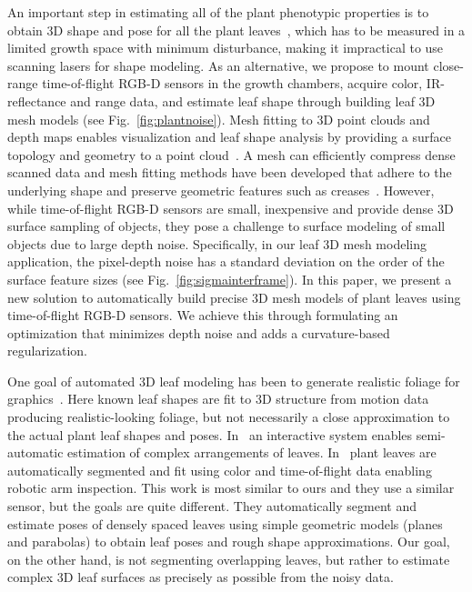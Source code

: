 An important step in estimating all of the plant phenotypic properties is to obtain $3$D shape and pose for all the plant leaves~\cite{muller2015leaf}, which has to be measured in a limited growth space with minimum disturbance, making it impractical to use scanning lasers for shape modeling. As an alternative, we propose to mount close-range time-of-flight RGB-D sensors in the growth chambers, acquire color, IR-reflectance and range data, and estimate leaf shape through building leaf $3$D mesh models (see Fig.~\ref{fig:plantnoise}). Mesh fitting to $3$D point clouds and depth maps enables visualization and leaf shape analysis by providing a surface topology and geometry to a point cloud~\cite{Sienz2000,Yeh2011}.  A mesh can efficiently compress dense scanned data and mesh fitting methods have been developed that adhere to the underlying shape and preserve geometric features such as creases~\cite{Hoppe1994,Kobbelt:1998}. 
%
However, while time-of-flight RGB-D sensors are small, inexpensive and provide dense $3$D surface sampling of objects, they pose a challenge to surface modeling of small objects due to large depth noise. Specifically, in our leaf $3$D mesh modeling application, the pixel-depth noise has a standard deviation on the order of the surface feature sizes (see Fig.~\ref{fig:sigmainterframe}). In this paper, we present a new solution to automatically build precise $3$D mesh models of plant leaves using time-of-flight RGB-D sensors. We achieve this through formulating an optimization that minimizes depth noise and adds a curvature-based regularization.  

One goal of automated $3$D leaf modeling has been to generate realistic foliage for graphics~\cite{Bradley:2013}.  Here known leaf shapes are fit to $3$D structure from motion data producing realistic-looking foliage, but not necessarily a close approximation to the actual plant leaf shapes and poses.  In~\cite{Quan:2006} an interactive system enables semi-automatic estimation of complex arrangements of leaves.   In~\cite{Alenya2011,Alenya2013} plant leaves are automatically segmented and fit using color and time-of-flight data enabling robotic arm inspection.  This work is most similar to ours and they use a similar sensor, but the goals are quite different.  They automatically segment and estimate poses of densely spaced leaves using simple geometric models (planes and parabolas) to obtain leaf poses and rough shape approximations.  Our goal, on the other hand, is not segmenting overlapping leaves, but rather to estimate complex $3$D leaf surfaces as precisely as possible from the noisy data. 


